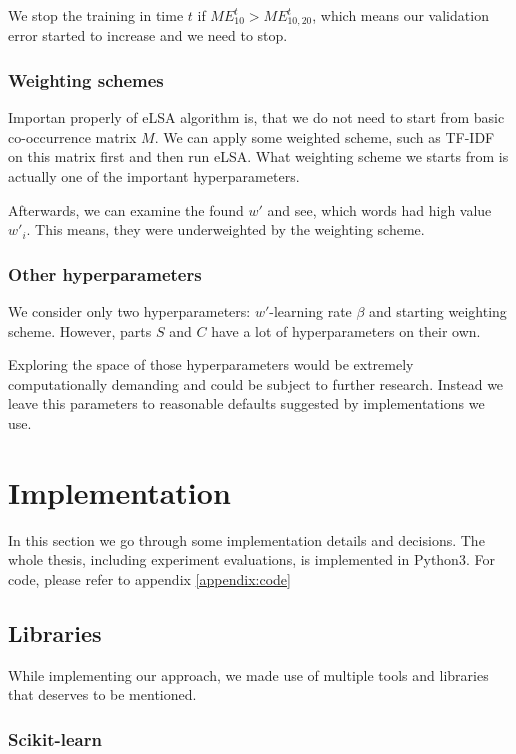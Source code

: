     We stop the training in time $t$ if $ME_{10}^t > ME_{10,20}^t$, which means our validation error started to increase and we need to stop.
    
    \subsubsection{Weighting schemes}
    
    Importan properly of eLSA algorithm is, that we do not need to start from basic co-occurrence matrix $M$. 
    We can apply some weighted scheme, such as TF-IDF on this matrix first and then run eLSA.
    What weighting scheme we starts from is actually one of the important hyperparameters.
    
    Afterwards, we can examine the found $w'$ and see, which words had high value $w'_i$.
    This means, they were underweighted by the weighting scheme.

    \subsubsection{Other hyperparameters}
    
    We consider only two hyperparameters: $w'$-learning rate $\beta$ and starting weighting scheme.
    However, parts $S$ and $C$ have a lot of hyperparameters on their own. 
    
    Exploring the space of those hyperparameters would be extremely computationally demanding and could be subject to further research.
    Instead we leave this parameters to reasonable defaults suggested by implementations we use.


\section{Implementation}
    
    In this section we go through some implementation details and decisions.
    The whole thesis, including experiment evaluations, is implemented in Python3.
    For code, please refer to appendix \ref{appendix:code}

    \subsection{Libraries} 

    While implementing our approach, we made use of multiple tools and libraries that deserves to be mentioned.

    \subsubsection{Scikit-learn}
    
